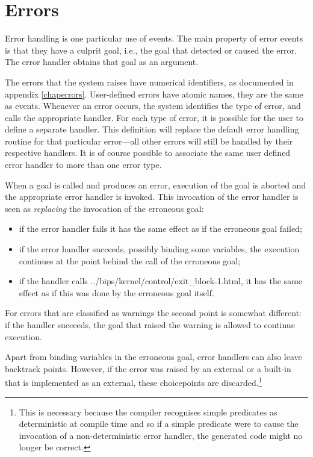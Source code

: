 \section{Errors}
Error handling is one particular use of events.
The main property of error events is that they have a culprit goal,
i.e., the goal that detected or caused the error.
The error handler obtains that goal as an argument.

The errors that the system raises have numerical identifiers,
as documented in appendix \ref{chaperrors}.
User-defined errors have atomic names, they are the same as events.
Whenever an error occurs, the {\eclipse} system identifies the type of error,
and
calls the appropriate handler. For each type of error, it is possible
for the user to define a separate handler. This definition will replace
the default error handling routine for that particular error---all other
errors will still
be handled by their respective
handlers.
It is of
course possible to associate the same user defined error handler to more
than one error type.

When a goal is called and produces an error, execution of the goal
is aborted and the appropriate error handler is invoked.
This invocation of the error handler is seen as \emph{replacing}
the invocation of the erroneous goal:
\begin{itemize}
\item if the error handler fails it has the same effect as if the
erroneous goal failed;
\item if the error handler succeeds, possibly binding some variables,
the execution continues at the point behind the call of the erroneous goal;
\item if the handler calls %
{../bips/kernel/control/exit_block-1.html}, it has the same effect as if
this was done by the erroneous goal itself.
\end{itemize}
For errors that are classified as warnings the second point is somewhat
different: if the handler succeeds, the goal that raised the warning
is allowed to continue execution.

Apart from binding variables in the erroneous goal, error handlers can
also leave backtrack points. However, if the error was raised by
an external or a built-in that is implemented as an external, these
choicepoints are discarded.\footnote{%
  This is necessary because the compiler recognises simple predicates as
  deterministic at compile time and so if a simple predicate were to cause the
  invocation of a non-deterministic error handler, the generated code might no
  longer be correct.}


